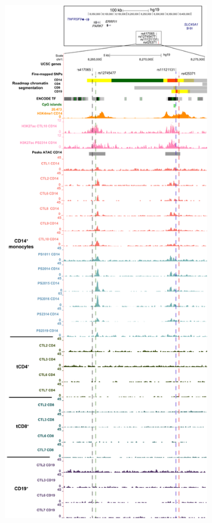 \begin{figure}[htbp]
\centering
\includegraphics[width=0.8\textwidth]{./Results2/pdfs/UCSC_TNFRSF9_credible_set_track}

\end{figure}
